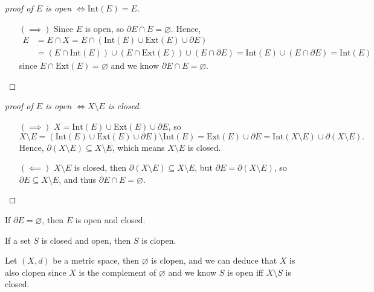 \begin{proof}[proof of \(E\) is open \(\iff \mathrm{Int}(E) = E\)]
    \vphantom{text}
    \begin{itemize}
        \item [\((\implies )\)] Since \(E\) is open, so \(\partial E \cap E = \varnothing \). Hence, 
        \begin{align*}
            E &= E \cap X = E \cap (\mathrm{Int}(E) \cup \mathrm{Ext}(E) \cup \partial E) \\
            &= (E \cap \mathrm{Int}(E) ) \cup (E \cap \mathrm{Ext}(E)) \cup (E \cap \partial E) = \mathrm{Int}(E) \cup (E \cap \partial E) = \mathrm{Int}(E)
        \end{align*}
        since \(E \cap \mathrm{Ext}(E) =\varnothing  \) and we know \(\partial E \cap E = \varnothing \).  
    \end{itemize}
\end{proof}
\begin{proof}[proof of \(E\) is open \(\iff X\setminus E\) is closed]
    \vphantom{text}
    \begin{itemize}
        \item [\((\implies )\)]
            \(X = \mathrm{Int}(E) \cup \mathrm{Ext}(E) \cup \partial E\), so
            \[
                X \setminus E = (\mathrm{Int}(E) \cup \mathrm{Ext}(E) \cup \partial E ) \setminus \mathrm{Int}(E) = \mathrm{Ext}(E) \cup \partial E = \mathrm{Int}(X\setminus E) \cup \partial (X \setminus E). 
            \] 
            Hence, \(\partial (X \setminus E) \subseteq X\setminus E\), which means \(X \setminus E\) is closed. 
        \item [\((\impliedby )\)] \(X \setminus E\) is closed, then \(\partial (X \setminus E) \subseteq X \setminus E\), but \(\partial E = \partial (X \setminus E)\), so \(\partial E \subseteq X \setminus E\), and thus \(\partial E \cap E = \varnothing \).     
    \end{itemize}
\end{proof}

\begin{remark}
    If \(\partial E = \varnothing \), then \(E\) is open and closed.   
\end{remark}

\begin{remark}
    If a set \(S\) is closed and open, then \(S\) is clopen.  
\end{remark}

\begin{remark}
    Let \((X, d)\) be a metric space, then \(\varnothing \) is clopen, and we can deduce that \(X\) is also clopen since \(X\) is the complement of \(\varnothing \) and we know \(S\) is open iff \(X\setminus S\) is closed.      
\end{remark}

